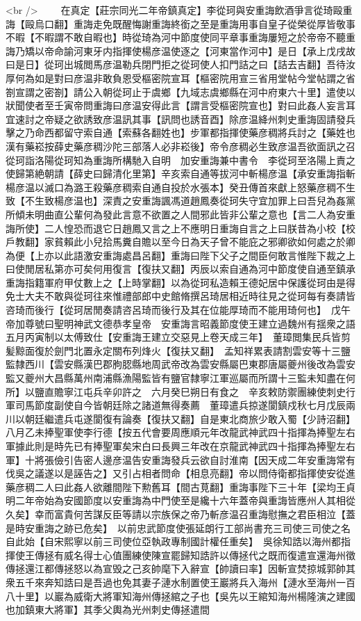 <br />
　　在真定【莊宗同光二年帝鎮真定】李從珂與安重誨飲酒爭言從琦毆重誨【毆烏口翻】重誨走免既醒悔謝重誨終銜之至是重誨用事自皇子從榮從厚皆敬事不暇【不暇謂不敢自暇也】時從琦為河中節度使同平章事重誨屢短之於帝帝不聽重誨乃矯以帝命諭河東牙内指揮使楊彦温使逐之【河東當作河中】是日【承上戊戌故曰是日】從珂出城閲馬彦温勒兵閉門拒之從珂使人扣門詰之曰【詰去吉翻】吾待汝厚何為如是對曰彦温非敢負恩受樞密院宣耳【樞密院用宣三省用堂帖今堂帖謂之省劄宣謂之密劄】請公入朝從珂止于虞鄉【九域志虞鄉縣在河中府東六十里】遣使以狀聞使者至壬寅帝問重誨曰彦温安得此言【謂言受樞密院宣也】對曰此姦人妄言耳宜速討之帝疑之欲誘致彦温訊其事【訊問也誘音酉】除彦温絳州刺史重誨固請發兵擊之乃命西都留守索自通【索蘇各翻姓也】步軍都指揮使藥彦稠將兵討之【藥姓也漢有藥崧按薛史藥彦稠沙陀三部落人必非崧後】帝令彦稠必生致彦温吾欲面訊之召從珂詣洛陽從珂知為重誨所構馳入自明　加安重誨兼中書令　李從珂至洛陽上責之使歸第絶朝請【薛史曰歸清化里第】辛亥索自通等拔河中斬楊彦温【承安重誨指斬楊彦温以滅口為潞王殺藥彦稠索自通自投於水張本】癸丑傳首來獻上怒藥彦稠不生致【不生致楊彦温也】深責之安重誨諷馮道趙鳳奏從珂失守宜加罪上曰吾兒為姦黨所傾未明曲直公輩何為發此言意不欲置之人間邪此皆非公輩之意也【言二人為安重誨所使】二人惶恐而退它日趙鳳又言之上不應明日重誨自言之上曰朕昔為小校【校戶教翻】家貧賴此小兒拾馬糞自贍以至今日為天子曾不能庇之邪卿欲如何處之於卿為便【上亦以此語激安重誨處昌呂翻】重誨曰陛下父子之間臣何敢言惟陛下裁之上曰使閒居私第亦可矣何用復言【復扶又翻】丙辰以索自通為河中節度使自通至鎮承重誨指籍軍府甲仗數上之【上時掌翻】以為從珂私造賴王德妃居中保護從珂由是得免士大夫不敢與從珂往來惟禮部郎中史館脩撰呂琦居相近時往見之從珂每有奏請皆咨琦而後行【從珂居閒奏請咨呂琦而後行及其在位能厚琦而不能用琦何也】　戊午帝加尊號曰聖明神武文德恭孝皇帝　安重誨言昭義節度使王建立過魏州有揺衆之語五月丙寅制以太傅致仕【安重誨王建立交惡見上卷天成三年】　董璋閲集民兵皆剪髪黥面復於劍門北置永定關布列烽火【復扶又翻】　孟知祥累表請割雲安等十三鹽監隸西川【雲安縣漢巴郡胊䏰縣地周武帝改為雲安縣屬巴東郡唐屬夔州後改為雲安監又夔州大昌縣萬州南浦縣漁陽監皆有鹽官隸寧江軍巡屬而所謂十三監未知盡在何所】以鹽直贍寧江屯兵辛卯許之　六月癸巳朔日有食之　辛亥敕防禦團練使刺史行軍司馬節度副使自今皆朝廷除之諸道無得奏薦　董璋遣兵掠遂閬鎮戍秋七月戊辰兩川以朝廷繼遣兵屯遂閬復有論奏【復扶又翻】自是東北商旅少敢入蜀【少詩沼翻】八月乙未捧聖軍使李行德【按五代會要周應順元年改龍武神武四十指揮為捧聖左右軍據此則是時先已有捧聖軍矣宋白曰長興三年改在京龍武神武四十指揮為捧聖左右軍】十將張儉引告密人邊彦温告安重誨發兵云欲自討淮南【因天成二年安重誨常有伐吳之議遂以是誣告之】又引占相者問命【相息亮翻】帝以問侍衛都指揮使安從進藥彦稠二人曰此姦人欲離間陛下勲舊耳【間古莧翻】重誨事陛下三十年【梁均王貞明二年帝始為安國節度以安重誨為中門使至是纔十六年蓋帝與重誨皆應州人其相從久矣】幸而富貴何苦謀反臣等請以宗族保之帝乃斬彦温召重誨慰撫之君臣相泣【蓋是時安重誨之跡已危矣】　以前忠武節度使張延朗行工部尚書充三司使三司使之名自此始【自宋熙寧以前三司使位亞執政專制國計權任重矣】　吳徐知誥以海州都指揮使王傳拯有威名得士心值團練使陳宣罷歸知誥許以傳拯代之既而復遣宣還海州徵傳拯還江都傳拯怒以為宣毁之己亥帥麾下入辭宣【帥讀曰率】因斬宣焚掠城郭帥其衆五千來奔知誥曰是吾過也免其妻子漣水制置使王巖將兵入海州【漣水至海州一百八十里】以巖為威衛大將軍知海州傳拯綰之子也【吳先以王綰知海州楊隆演之建國也加鎮東大將軍】其季父輿為光州刺史傳拯遣間
